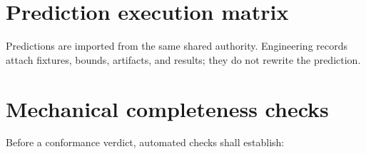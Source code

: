 \documentclass[10pt]{article}
\newcommand{\MaybeRequirementBreak}[1]{%
  \ifcsname SCIMapRequirementBreak#1\endcsname
    \csname SCIMapRequirementBreak#1\endcsname
  \fi}
\begin{document}
\renewcommand{\SCIMapRequirement}[4]{%
  \MaybeRequirementBreak{#1}%
  \phantomsection\label{engreq:#1}%
  \noindent\textbf{\textcolor{EngNavy}{#1} -- #2}\par\nobreak
  \textbf{Canonical clause:} #3\par
  \textbf{Minimum conformance evidence:} #4\par
  \textbf{Result:} \textcolor{EngGray}{\texttt{not\_assessed}}\par
  \smallskip\hrule\smallskip}
\begin{sloppypar}\small
\SCIMapRequirements
\end{sloppypar}\normalsize

\clearpage
\section{Prediction execution matrix}\label{sec:predictions}

Predictions are imported from the same shared authority. Engineering records
attach fixtures, bounds, artifacts, and results; they do not rewrite the
prediction.

\renewcommand{\SCIMapPrediction}[4]{%
  \par\begin{minipage}{\linewidth}%
  \phantomsection\label{engpred:#1}%
  \noindent\textbf{\textcolor{EngNavy}{#1} -- #2}\par
  \textbf{Canonical prediction:} #3\par
  \textbf{Primary claim layer:} #4.\par
  \textbf{Fixture / bound / result:} \textcolor{EngGray}{\texttt{not\_assessed}; preregistration pending}\par
  \smallskip\hrule
  \end{minipage}\par\smallskip}
\SCIMapPredictions

\clearpage
\section{Mechanical completeness checks}

Before a conformance verdict, automated checks shall establish:
\end{document}

